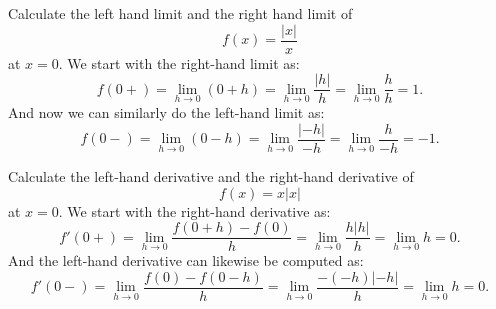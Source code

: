 Calculate the left hand limit and the right hand limit of
\[ 
f(x) = \frac{\left| x \right|}{x}
\]
at $x = 0$.
\bigbreak
We start with the right-hand limit as:
\[ 
f(0+) = \lim_{h \to 0} \left( 0 + h \right) = \lim_{h \to 0} \frac{|h|}{h} = \lim_{h \to 0} \frac{h}{h} = 1
.\]
And now we can similarly do the left-hand limit as:
\[ 
f(0-) = \lim_{h \to 0} \left(  0- h \right) = \lim_{h \to 0} \frac{\left| -h \right|}{-h} = \lim_{h \to 0} \frac{h}{-h} = -1
.\]


Calculate the left-hand derivative and the right-hand derivative of
\[ 
f(x) = x \left| x \right|
\]
at $x = 0$.
\bigbreak
We start with the right-hand derivative as:
\[ 
f'(0+) = \lim_{h \to 0} \frac{f(0 + h) - f(0)}{h} = \lim_{h \to 0} \frac{h |h|}{h} = \lim_{h \to 0} h = 0
.\]
And the left-hand derivative can likewise be computed as:
\[ 
f'(0-) = \lim_{h \to 0} \frac{f(0) - f(0 - h)}{h} = \lim_{h \to 0} \frac{-(-h) |-h|}{h} = \lim_{h \to 0} h = 0 
.\]

